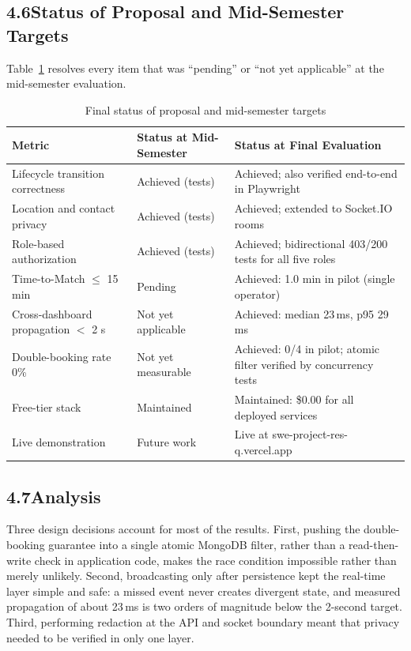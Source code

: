 \documentclass[11pt,a4paper]{article}
\begin{document}
\subsection{4.6\quad Status of Proposal and Mid-Semester Targets}\label{s46}

Table~\ref{tab:final} resolves every item that was ``pending'' or ``not yet applicable'' at the mid-semester evaluation.

\renewcommand{\arraystretch}{1.25}
\begin{table}[H]
\centering
\begin{tabularx}{\textwidth}{@{}p{1.5in}p{1.85in}X@{}}
\toprule
\textbf{Metric} & \textbf{Status at Mid-Semester} & \textbf{Status at Final Evaluation}\\
\midrule
Lifecycle transition correctness & Achieved (tests) & Achieved; also verified end-to-end in Playwright\\
Location and contact privacy & Achieved (tests) & Achieved; extended to Socket.IO rooms\\
Role-based authorization & Achieved (tests) & Achieved; bidirectional 403/200 tests for all five roles\\
Time-to-Match $\leq$ 15 min & Pending & Achieved: 1.0 min in pilot (single operator)\\
Cross-dashboard propagation $<$ 2 s & Not yet applicable & Achieved: median 23\,ms, p95 29\,ms\\
Double-booking rate 0\% & Not yet measurable & Achieved: 0/4 in pilot; atomic filter verified by concurrency tests\\
Free-tier stack & Maintained & Maintained: \$0.00 for all deployed services\\
Live demonstration & Future work & Live at swe-project-res-q.vercel.app\\
\bottomrule
\end{tabularx}
\caption{Final status of proposal and mid-semester targets}\label{tab:final}
\end{table}
\renewcommand{\arraystretch}{1}

\subsection{4.7\quad Analysis}\label{s47}

Three design decisions account for most of the results. First, pushing the double-booking guarantee into a single atomic MongoDB filter, rather than a read-then-write check in application code, makes the race condition impossible rather than merely unlikely. Second, broadcasting only after persistence kept the real-time layer simple and safe: a missed event never creates divergent state, and measured propagation of about 23\,ms is two orders of magnitude below the 2-second target. Third, performing redaction at the API and socket boundary meant that privacy needed to be verified in only one layer.
\end{document}
